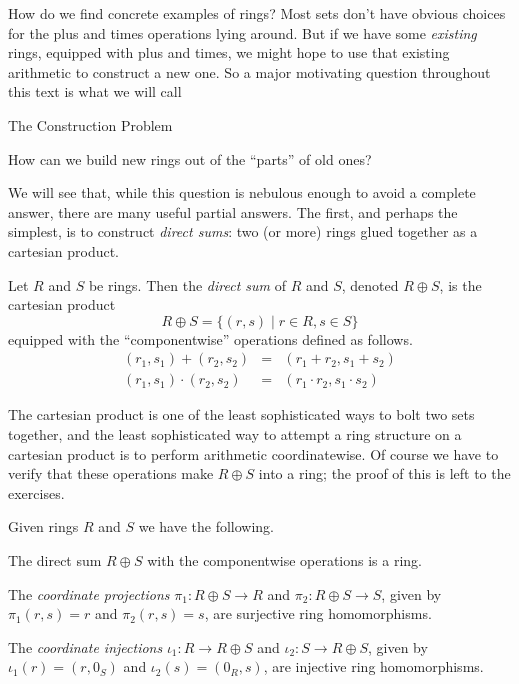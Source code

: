 How do we find concrete examples of rings? Most sets don't have obvious choices for the plus and times operations lying around. But if we have some \emph{existing} rings, equipped with plus and times, we might hope to use that existing arithmetic to construct a new one. So a major motivating question throughout this text is what we will call
\begin{titlebox}{The Construction Problem}
\begin{center}
How can we build new rings out of the ``parts'' of old ones?
\end{center}
\end{titlebox}
We will see that, while this question is nebulous enough to avoid a complete answer, there are many useful partial answers. The first, and perhaps the simplest, is to construct \emph{direct sums}: two (or more) rings glued together as a cartesian product.

\begin{dfn} \label{dfn:direct-sum}
Let \(R\) and \(S\) be rings. Then the \emph{direct sum}  of \(R\) and \(S\), denoted \(R \oplus S\), is the cartesian product \[ R \oplus S = \{ (r,s) \mid r \in R, s \in S \} \] equipped with the ``componentwise'' operations defined as follows.
\begin{eqnarray*}
(r_1, s_1) + (r_2, s_2) & = & (r_1 + r_2, s_1 + s_2) \\
(r_1, s_1) \cdot (r_2, s_2) & = & (r_1 \cdot r_2, s_1 \cdot s_2)
\end{eqnarray*}
\end{dfn}

The cartesian product is one of the least sophisticated ways to bolt two sets together, and the least sophisticated way to attempt a ring structure on a cartesian product is to perform arithmetic coordinatewise. Of course we have to verify that these operations make \(R \oplus S\) into a ring; the proof of this is left to the exercises.

\begin{prop} \label{prop:direct-sum}
Given rings \(R\) and \(S\) we have the following.
\begin{proplist}
\item The direct sum \(R \oplus S\) with the componentwise operations is a ring.
\item The \emph{coordinate projections} \(\pi_1 : R \oplus S \rightarrow R\) and \(\pi_2 : R \oplus S \rightarrow S\), given by \(\pi_1(r,s) = r\) and \(\pi_2(r,s) = s\), are surjective ring homomorphisms.
\item The \emph{coordinate injections} \(\iota_1 : R \rightarrow R \oplus S\) and \(\iota_2 : S \rightarrow R \oplus S\), given by \(\iota_1(r) = (r,0_S)\) and \(\iota_2(s) = (0_R,s)\), are injective ring homomorphisms.
\end{proplist}
\end{prop}

